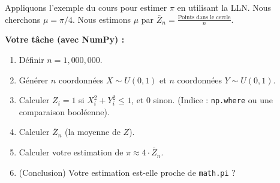 \begin{exercicebox}
Appliquons l'exemple du cours pour estimer $\pi$ en utilisant la LLN.
Nous cherchons $\mu = \pi/4$. Nous estimons $\mu$ par $\bar{Z}_n = \frac{\text{Points dans le cercle}}{n}$.

\textbf{Votre tâche (avec NumPy) :}
\begin{enumerate}
    \item Définir $n = 1,000,000$.
    \item Générer $n$ coordonnées $X \sim U(0, 1)$ et $n$ coordonnées $Y \sim U(0, 1)$.
    \item Calculer $Z_i = 1$ si $X_i^2 + Y_i^2 \le 1$, et $0$ sinon. (Indice : \texttt{np.where} ou une comparaison booléenne).
    \item Calculer $\bar{Z}_n$ (la moyenne de $Z$).
    \item Calculer votre estimation de $\pi \approx 4 \cdot \bar{Z}_n$.
    \item (Conclusion) Votre estimation est-elle proche de \texttt{math.pi} ?
\end{enumerate}
\end{exercicebox}